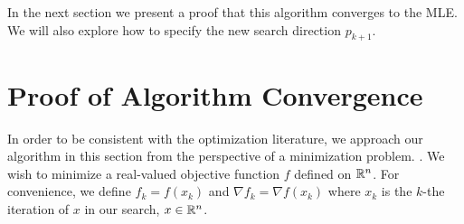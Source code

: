 In the next section we present a proof that this algorithm converges to the MLE.  We will also explore how to specify the new search direction $p_{k+1}$.

\section{Proof of Algorithm Convergence}
In order to be consistent with the optimization literature, we approach our algorithm in this section from the perspective of a minimization problem. \citep{Fletcher, NW}.  We wish to minimize a real-valued objective function $f$ defined on ${\mathbb R}^n$.  For convenience, we define $f_k = f(x_k)$ and $\nabla f_k = \nabla f( x_k )$ where $x_k$ is the $k$-the iteration of $x$ in our search, $x \in {\mathbb R}^n$.  

